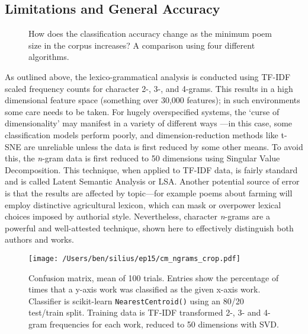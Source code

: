 \documentclass[twocolumn, switch, a4paper]{article} %
\begin{document}
\subsection{Limitations and General Accuracy}
\label{sec: ngram_acc}

\begin{figure*}
  \caption{How does the classification accuracy change as the minimum poem
  size in the corpus increases? A comparison using four different algorithms.}
  \label{fig:ngram_acc}
  \centering
  \qquad
\end{figure*}

As outlined above, the lexico-grammatical analysis is conducted using TF-IDF
scaled frequency counts for character 2-, 3-, and 4-grams. This results in a
high dimensional feature space (something over 30,000 features); in such
environments some care needs to be taken. For hugely overspecified systems,
the `curse of dimensionality' may manifest in a variety of different ways
\cite{zimek_etal}---in this case, some classification models perform poorly,
and dimension-reduction methods like t-SNE are unreliable unless the data is
first reduced by some other means. To avoid this, the \emph{n}-gram data is
first reduced to 50 dimensions using Singular Value Decomposition. This
technique, when applied to TF-IDF data, is fairly standard and is called
Latent Semantic Analysis or LSA. Another potential source of error is that the
results are affected by topic---for example poems about farming will employ
distinctive agricultural lexicon, which can mask or overpower lexical choices
imposed by authorial style. Nevertheless, character \emph{n}-grams are a
powerful and well-attested technique, shown here to effectively distinguish
both authors and works.

\begin{figure}
\caption{
  Confusion matrix, mean of 100 trials. Entries show the percentage of times
that a y-axis work was classified as the given x-axis work. Classifier is
scikit-learn \texttt{NearestCentroid()} using an 80/20 test/train split.
Training data is TF-IDF transformed 2-, 3- and 4-gram frequencies for each
work, reduced to 50 dimensions with SVD. }
\label{fig:cm_ngrams}
\texttt{[image: /Users/ben/silius/ep15/cm\_ngrams\_crop.pdf]}
\end{figure}
\end{document}
